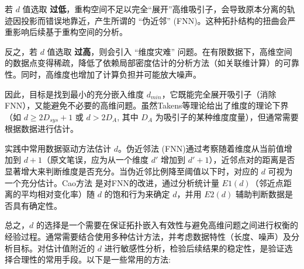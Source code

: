 若 $d$ 值选取 \textbf{过低}，重构空间不足以完全“展开”高维吸引子，会导致原本分离的轨迹因投影而错误地靠近，产生所谓的 “伪近邻” (FNN)。这种拓扑结构的扭曲会严重影响后续基于重构空间的分析。

反之，若 $d$ 值选取 \textbf{过高}，则会引入 “维度灾难” 问题。在有限数据下，高维空间的数据点变得稀疏，降低了依赖局部密度估计的分析方法（如关联维计算）的可靠性。同时，高维度也增加了计算负担并可能放大噪声。

因此，目标是找到最小的充分嵌入维度 $d_{min}$，它既能完全展开吸引子（消除FNN），又能避免不必要的高维问题。虽然Takens等理论给出了维度的理论下界（如 $d \ge 2D_{sys}+1$ 或 $d > 2D_A$, 其中 $D_A$ 为吸引子的某种维度度量），但通常需要根据数据进行估计。

实践中常用数据驱动方法估计 $d$。伪近邻法 (FNN)\cite{rhodes1997false}通过考察随着维度从当前值增加到 $d+1$（原文笔误，应为从一个维度 $d'$ 增加到 $d'+1$），近邻点对的距离是否显著增大来判断维度是否充分。当伪近邻比例降至阈值以下时，对应的 $d$ 可视为一个充分估计。Cao方法\cite{cao1997practical} 是对FNN的改进，通过分析统计量 $E1(d)$（邻近点距离的平均相对变化率）随 $d$ 的饱和行为来确定 $d$，并用 $E2(d)$ 辅助判断数据是否具有确定性。

总之，$d$ 的选择是一个需要在保证拓扑嵌入有效性与避免高维问题之间进行权衡的经验过程。通常需要结合使用多种估计方法，并考虑数据特性（长度、噪声）及分析目标。对估计值附近的 $d$ 进行敏感性分析，检验后续结果的稳定性，是验证选择合理性的常用手段。以下是一些常用的方法:
\newpage

